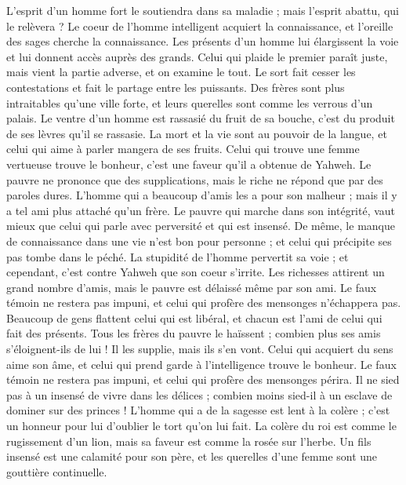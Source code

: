 \begin{multicols}{2}
L'esprit d'un homme fort le soutiendra dans sa maladie ; mais l'esprit abattu, qui le relèvera ?
Le coeur de l'homme intelligent acquiert la connaissance, et l'oreille des sages cherche la connaissance.
Les présents d'un homme lui élargissent la voie et lui donnent accès auprès des grands.
Celui qui plaide le premier paraît juste, mais vient la partie adverse, et on examine le tout.
Le sort fait cesser les contestations et fait le partage entre les puissants.
Des frères sont plus intraitables qu’une ville forte, et leurs querelles sont comme les verrous d'un palais.
Le ventre d’un homme est rassasié du fruit de sa bouche, c’est du produit de ses lèvres qu’il se rassasie.
La mort et la vie sont au pouvoir de la langue, et celui qui aime à parler mangera de ses fruits.
Celui qui trouve une femme vertueuse trouve le bonheur, c’est une faveur qu’il a obtenue de Yahweh.
Le pauvre ne prononce que des supplications, mais le riche ne répond que par des paroles dures.
L’homme qui a beaucoup d’amis les a pour son malheur ; mais il y a tel ami plus attaché qu'un frère.
\VerseOne{}Le pauvre qui marche dans son intégrité, vaut mieux que celui qui parle avec perversité et qui est insensé.
De même, le manque de connaissance dans une vie n'est bon pour personne ; et celui qui précipite ses pas tombe dans le péché.
La stupidité de l'homme pervertit sa voie ; et cependant, c’est contre Yahweh que son coeur s’irrite.
Les richesses attirent un grand nombre d'amis, mais le pauvre est délaissé même par son ami.
Le faux témoin ne restera pas impuni, et celui qui profère des mensonges n'échappera pas.
Beaucoup de gens flattent celui qui est libéral, et chacun est l’ami de celui qui fait des présents.
Tous les frères du pauvre le haïssent ; combien plus ses amis s’éloignent-ils de lui ! Il les supplie, mais ils s’en vont.
Celui qui acquiert du sens aime son âme, et celui qui prend garde à l'intelligence trouve le bonheur.
Le faux témoin ne restera pas impuni, et celui qui profère des mensonges périra.
Il ne sied pas à un insensé de vivre dans les délices ; combien moins sied-il à un esclave de dominer sur des princes !
L'homme qui a de la sagesse est lent à la colère ; c'est un honneur pour lui d’oublier le tort qu'on lui fait.
La colère du roi est comme le rugissement d'un lion, mais sa faveur est comme la rosée sur l'herbe.
Un fils insensé est une calamité pour son père, et les querelles d’une femme sont une gouttière continuelle.

\end{multicols}
